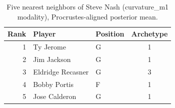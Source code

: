 \begin{table}[htbp]
  \centering\small
  \begin{tabular}{rllc}
    \toprule
    Rank & Player & Position & Archetype \\
    \midrule
    1 & Ty Jerome & G & 1 \\
    2 & Jim Jackson & G & 1 \\
    3 & Eldridge Recasner & G & 3 \\
    4 & Bobby Portis & F & 1 \\
    5 & Jose Calderon & G & 1 \\
    \bottomrule
  \end{tabular}
  \caption{Five nearest neighbors of Steve Nash (curvature_m1 modality), Procrustes-aligned posterior mean.}
  \label{tab:Steve_Nash_neighbors_curvature_m1}
\end{table}


